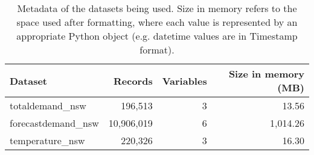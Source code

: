 \begin{table}[H]
\centering
\begin{tabular}{lrrr}
\toprule
Dataset & Records & Variables & Size in memory (MB) \\
\midrule
totaldemand\_nsw & 196,513 & 3 & 13.56 \\
forecastdemand\_nsw & 10,906,019 & 6 & 1,014.26 \\
temperature\_nsw & 220,326 & 3 & 16.30 \\
\bottomrule
\end{tabular}
\caption{Metadata of the datasets being used. Size in memory refers to the space used after formatting, where each value is represented by an appropriate Python object (e.g. datetime values are in Timestamp format).}
\label{metadata}
\end{table}
